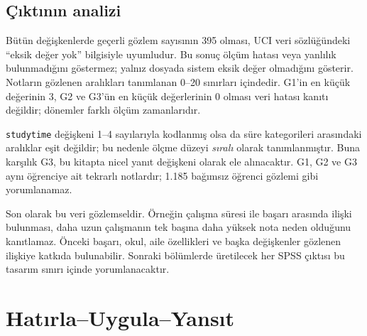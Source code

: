 \subsection{Çıktının analizi}

Bütün değişkenlerde geçerli gözlem sayısının 395 olması, UCI veri sözlüğündeki
``eksik değer yok'' bilgisiyle uyumludur. Bu sonuç ölçüm hatası veya yanlılık
bulunmadığını göstermez; yalnız dosyada sistem eksik değer olmadığını gösterir.
Notların gözlenen aralıkları tanımlanan 0--20 sınırları içindedir. G1'in en
küçük değerinin 3, G2 ve G3'ün en küçük değerlerinin 0 olması veri hatası
kanıtı değildir; dönemler farklı ölçüm zamanlarıdır.

\texttt{studytime} değişkeni 1--4 sayılarıyla kodlanmış olsa da süre
kategorileri arasındaki aralıklar eşit değildir; bu nedenle ölçme düzeyi
\emph{sıralı} olarak tanımlanmıştır. Buna karşılık G3, bu kitapta nicel yanıt
değişkeni olarak ele alınacaktır. G1, G2 ve G3 aynı öğrenciye ait tekrarlı
notlardır; 1.185 bağımsız öğrenci gözlemi gibi yorumlanamaz.

Son olarak bu veri gözlemseldir. Örneğin çalışma süresi ile başarı arasında
ilişki bulunması, daha uzun çalışmanın tek başına daha yüksek nota neden
olduğunu kanıtlamaz. Önceki başarı, okul, aile özellikleri ve başka değişkenler
gözlenen ilişkiye katkıda bulunabilir. Sonraki bölümlerde üretilecek her SPSS
çıktısı bu tasarım sınırı içinde yorumlanacaktır.




\section*{Hatırla--Uygula--Yansıt}

